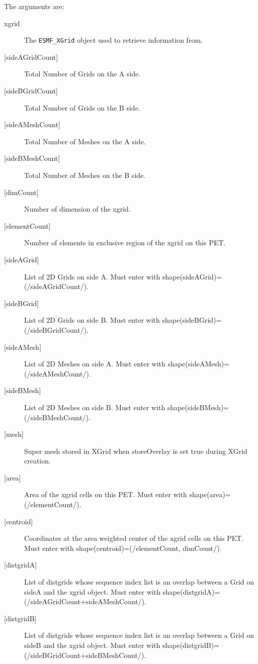        The arguments are:
       \begin{description}
       \item [xgrid]
         The {\tt ESMF\_XGrid} object used to retrieve information from.
       \item [{[sideAGridCount]}]
             Total Number of Grids on the A side.
       \item [{[sideBGridCount]}]
             Total Number of Grids on the B side.
       \item [{[sideAMeshCount]}]
             Total Number of Meshes on the A side.
       \item [{[sideBMeshCount]}]
             Total Number of Meshes on the B side.
       \item [{[dimCount]}]
             Number of dimension of the xgrid.
       \item [{[elementCount]}]
            Number of elements in exclusive region of the xgrid on this PET.
       \item [{[sideAGrid]}]
             List of 2D Grids on side A. Must enter with shape(sideAGrid)=(/sideAGridCount/).
       \item [{[sideBGrid]}]
             List of 2D Grids on side B. Must enter with shape(sideBGrid)=(/sideBGridCount/).
       \item [{[sideAMesh]}]
             List of 2D Meshes on side A. Must enter with shape(sideAMesh)=(/sideAMeshCount/).
       \item [{[sideBMesh]}]
             List of 2D Meshes on side B. Must enter with shape(sideBMesh)=(/sideBMeshCount/).
       \item [{[mesh]}]
             Super mesh stored in XGrid when storeOverlay is set true during XGrid creation.
       \item [{[area]}]
             Area of the xgrid cells on this PET. Must enter with shape(area)=(/elementCount/).
       \item [{[centroid]}]
             Coordinates at the area weighted center of the xgrid cells on this PET. Must enter with shape(centroid)=(/elementCount, dimCount/).
       \item [{[distgridA]}]
             List of distgrids whose sequence index list is an overlap between a Grid
             on sideA and the xgrid object. Must enter with shape(distgridA)=(/sideAGridCount+sideAMeshCount/).
       \item [{[distgridB]}]
             List of distgrids whose sequence index list is an overlap between a Grid
             on sideB and the xgrid object. Must enter with shape(distgridB)=(/sideBGridCount+sideBMeshCount/).

\end{description}
